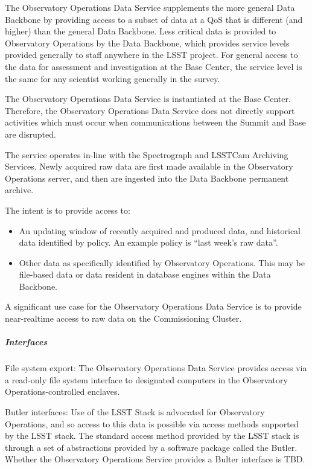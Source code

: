 The Observatory Operations Data Service supplements the more general Data
Backbone by providing access to a subset of data at a QoS that is
different (and higher) than the general Data Backbone.  Less critical
data is provided to Observatory Operations by the Data Backbone, which
provides service levels provided generally to staff anywhere in the
LSST project. For general access to the data for assessment and
investigation at the Base Center, the service level is the same for any
scientist working generally in the survey.

The Observatory Operations Data Service is instantiated at the Base
Center. Therefore, the Observatory Operations Data Service does not
directly support activities which must occur when communications
between the Summit and Base are disrupted.

The service operates in-line with the Spectrograph and LSSTCam Archiving 
Services. Newly acquired raw data are first made available in the Observatory 
Operations server, and then are ingested into the Data Backbone permanent archive. 

The intent is to provide access to: 

\begin{itemize}

\item An updating window of recently acquired and produced data, and 
historical data identified by policy. An example policy is ``last week’s raw data''. 

\item Other data as specifically identified  by Observatory Operations. 
This may be file-based data or data resident in database engines within 
the Data Backbone.

\end{itemize}

A significant use case for the Observatory Operations Data Service is to
provide near-realtime access to raw data on the Commissioning Cluster.

\subparagraph{Interfaces}

File system export: The Observatory Operations Data Service provides access
via a read-only file system interface to designated computers in the
Observatory Operations-controlled enclaves. 

Butler interfaces: Use of the LSST Stack is advocated for Observatory Operations, 
and so access to this data is possible via access methods supported by the LSST stack.  
The standard access method provided by the LSST stack is through a set of
abstractions provided by a software package called the Butler. Whether the Observatory
Operations Service provides a Bulter interface is TBD.

